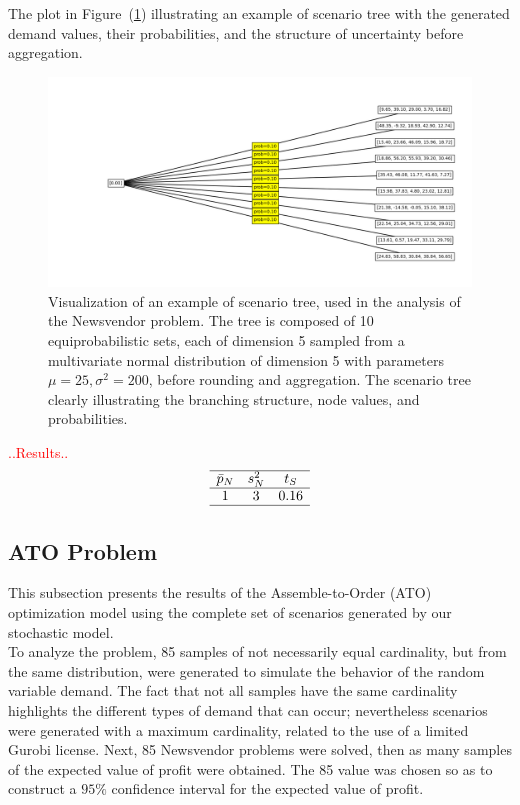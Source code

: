 \documentclass[a4paper,12pt]{article}
\begin{document}
	
	\noindent The plot in Figure~(\ref{fig:scenariotree-plot}) illustrating an example of scenario tree  with the generated demand values, their probabilities, and the structure of uncertainty before aggregation.
	\begin{figure}[H]
		\includegraphics[width=1\textwidth]{../immagini/scenariNV.png}
		\caption{Visualization of an example of scenario tree, used in the analysis of the Newsvendor problem. The tree is composed of 10 equiprobabilistic sets, each of dimension 5 sampled from a multivariate normal distribution of dimension 5 with parameters $\mu = 25, \sigma^{2} = 200$, before rounding and aggregation. The scenario tree clearly illustrating the branching structure, node values, and probabilities. }
		\label{fig:scenariotree-plot}
	\end{figure}
	
	
	\textcolor{red}{..Results..}
	\[
	\begin{array}{ccc}
		\hline
		\text{$\bar{p}_{N}$} & \text{$s_{N}^{2}$} & \text{$t_{S}$}\\
		\hline
		1 & 3 & 0.16 \\
		\hline
	\end{array}
	\]
	
	\label{tab:nv-results-stat}
	
	
	\subsection{ATO Problem}
	
	This subsection presents the results of the Assemble-to-Order (ATO) optimization model using the complete set of scenarios generated by our stochastic model.\\
	
	\noindent To analyze the problem, 85 samples of not necessarily equal cardinality, but from the same distribution, were generated to simulate the behavior of the random variable demand. The fact that not all samples have the same cardinality highlights the different types of demand that can occur; nevertheless scenarios were generated with a maximum cardinality, related to the use of a limited Gurobi license. Next, 85 Newsvendor problems were solved, then as many samples of the expected value of profit were obtained. The 85 value was chosen so as to construct a $95\%$ confidence interval for the expected value of profit. \\
	
\end{document}
